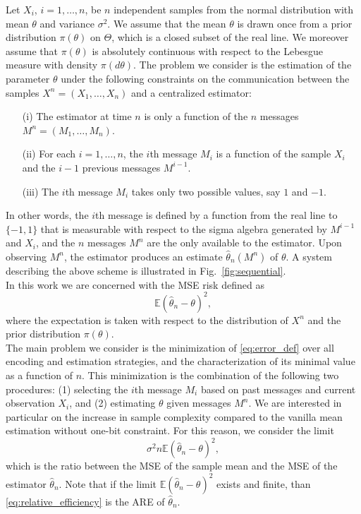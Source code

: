 \documentclass[letterpaper, conference,9pt]{IEEEtran}      %
\begin{document}
Let $X_i$, $i=1,\ldots,n$, be $n$ independent samples from the normal distribution with mean $\theta$ and variance $\sigma^2$. 
We assume that the mean $\theta$ is drawn once from a prior distribution $\pi(\theta)$ on $\Theta$, which is a closed subset of the real line. We moreover assume that $\pi(\theta)$ is absolutely continuous with respect to the Lebesgue measure with density $\pi(d\theta)$. The problem we consider is the estimation of the parameter $\theta$ under the following constraints on the communication between the samples $X^n = (X_1,\ldots,X_n)$ and a centralized estimator: 
\begin{itemize}
\item[(i)] The estimator at time $n$ is only a function of the $n$ messages $M^n = \left(M_1,\ldots,M_n \right)$.
\item[(ii)] For each $i=1,\ldots,n$, the $i$th message $M_i$ is a function of the sample $X_i$ and the $i-1$ previous messages $M^{i-1}$.
\item[(iii)] The $i$th message $M_i$ takes only two possible values, say $1$ and $-1$. 
\end{itemize}
In other words, the $i$th message is defined by a function from the real line to $\{-1,1\}$ that is measurable with respect to the sigma algebra generated by $M^{i-1}$ and $X_i$, and the $n$ messages $M^n$ are the only available to the estimator. Upon observing $M^n$, the estimator produces an estimate $\widehat{\theta}_n(M^n)$ of $\theta$. A system describing the above scheme is illustrated in Fig.~\ref{fig:sequential}. \\

In this work we are concerned with the MSE risk defined as
\begin{equation}
\label{eq:error_def}
\mathbb E\left(\widehat{\theta}_n - \theta \right)^2,
\end{equation}
where the expectation is taken with respect to the distribution of $X^n$ and the prior distribution $\pi(\theta)$. \\

The main problem we consider is the minimization of \eqref{eq:error_def} over all encoding and estimation strategies, and the characterization of its minimal value as a function of $n$. This minimization is the combination of the following two procedures: (1) selecting the $i$th message $M_i$ based on past messages and current observation $X_i$, and (2) estimating $\theta$ given messages $M^n$. 
%
We are interested in particular on the increase in sample complexity compared to the vanilla mean estimation without one-bit constraint. For this reason, we consider the limit
\begin{equation}
{\sigma^2} n \mathbb E\left(\widehat{\theta}_n - \theta \right)^2,
\label{eq:relative_efficiency}
\end{equation}
which is the ratio between the MSE of the sample mean and the MSE of the estimator $\widehat{\theta}_n$. Note that if the limit $\mathbb E\left(\widehat{\theta}_{n} - \theta \right)^2$ exists and finite, than \eqref{eq:relative_efficiency} is the ARE of $\widehat{\theta}_n$. 
\end{document}
